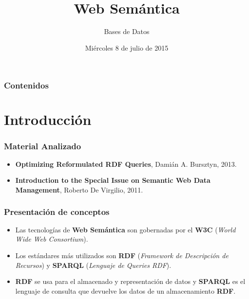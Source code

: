 \documentclass{beamer}
\title[Presentación del TP2]{Web Semántica} %
\author{Bases de Datos} %
\institute[] %
{
Federico Allocati, Sabrina Izcovich, Santiago Pernigotti, Germán Romano\\ %
\medskip
}
\date{Miércoles 8 de julio de 2015} %
\begin{document}
\begin{frame}
\titlepage %
\end{frame}

\begin{frame}
\frametitle{Contenidos} %
\tableofcontents %
\end{frame}


\section{Introducción} 
\begin{frame}
\frametitle{Material Analizado}
\begin{itemize}
\item \textbf{Optimizing Reformulated RDF Queries}, Damián A. Bursztyn, 2013.

\item \textbf{Introduction to the Special Issue on Semantic Web Data Management}, Roberto De Virgilio, 2011.
\end{itemize}
\end{frame}


\begin{frame}
\frametitle{Presentación de conceptos}
\begin{itemize}
\item Las tecnologías de \textbf{Web Semántica} son gobernadas por el \textbf{W3C} (\textit{World Wide Web Consortium}).

\item Los estándares más utilizados son \textbf{RDF} (\textit{Framework de Descripción de Recursos}) y \textbf{SPARQL} (\textit{Lenguaje de Queries RDF}).

\item \textbf{RDF} se usa para el almacenado y representación de datos y \textbf{SPARQL} es el lenguaje de consulta que devuelve los datos de un almacenamiento \textbf{RDF}.
\end{itemize}
\end{frame}
\end{document}
